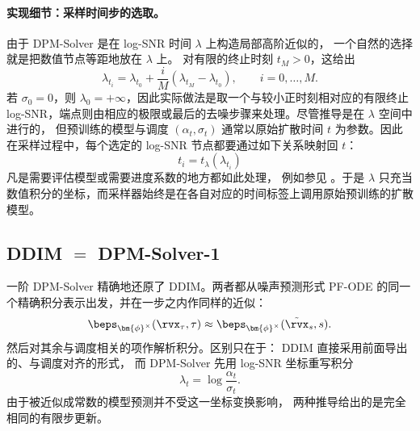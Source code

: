 \paragraph{实现细节：采样时间步的选取。}
由于 DPM-Solver 是在 log-SNR 时间 $\lambda$ 上构造局部高阶近似的，
一个自然的选择就是把数值节点等距地放在 $\lambda$ 上。
对有限的终止时刻 $t_M>0$，这给出
\[
\lambda_{t_i}
=
\lambda_{t_0}
+
\frac{i}{M}
\left(
\lambda_{t_M}-\lambda_{t_0}
\right),
\qquad
i=0,\ldots,M.
\]
若 $\sigma_0=0$，则 $\lambda_0=+\infty$，因此实际做法是取一个与较小正时刻相对应的有限终止 log-SNR，端点则由相应的极限或最后的去噪步骤来处理。尽管推导是在 $\lambda$ 空间中进行的，
但预训练的模型与调度 $(\alpha_t,\sigma_t)$ 通常以原始扩散时间
$t$ 为参数。因此在采样过程中，每个选定的 log-SNR 节点都要通过如下关系映射回 $t$：
\[
t_i=t_\lambda(\lambda_{t_i})
\]
凡是需要评估模型或需要进度系数的地方都如此处理，
例如参见 。于是 $\lambda$ 只充当
数值积分的坐标，而采样器始终是在各自对应的时间标签上调用原始预训练的扩散模型。


\subsection{DDIM $=$ DPM-Solver-1}
\label{subsec:ddim=dpm-solver-1}

一阶 DPM-Solver 精确地还原了 DDIM。两者都从噪声预测形式
PF-ODE 的同一个精确积分表示出发，并在一步之内作同样的近似：
\[
\beps_{\bm{\phi}^\times}(\rvx_\tau,\tau)
\approx
\beps_{\bm{\phi}^\times}(\tilde\rvx_s,s).
\]
然后对其余与调度相关的项作解析积分。区别只在于：
DDIM 直接采用前面导出的、与调度对齐的形式，
而 DPM-Solver 先用 log-SNR 坐标重写积分
\[
\lambda_t
=
\log\frac{\alpha_t}{\sigma_t}.
\]
由于被近似成常数的模型预测并不受这一坐标变换影响，
两种推导给出的是完全相同的有限步更新。



